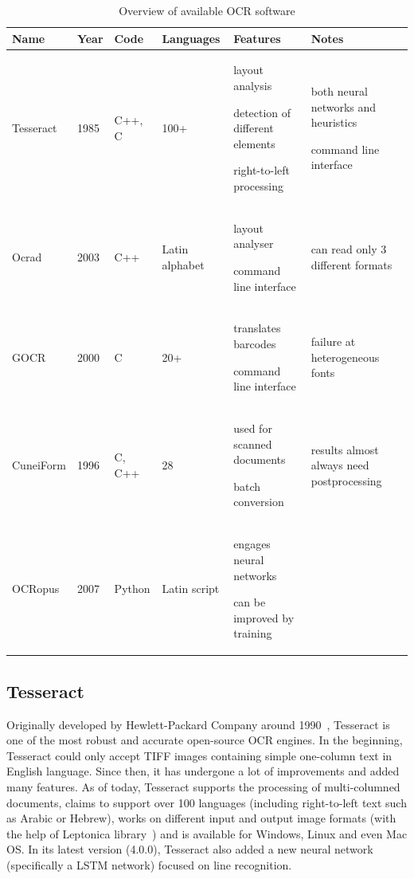 \begin{table}[t]
{\small
\begin{tabular}{p{4.6em}p{2em}p{3em}p{4.8em}p{7em}p{7em}}
\toprule
\textbf{Name} & \textbf{Year} & \textbf{Code} & \textbf{Languages} & \textbf{Features} & \textbf{Notes}\\
\midrule
Tesseract & 1985 & C++, C & 100+ & 
layout analysis

detection of different elements

right-to-left processing

&

both neural networks and heuristics

command line interface

\\
Ocrad & 2003 & C++ & Latin alphabet &  
layout analyser

command line interface
&
can read only 3 different formats
\\
GOCR & 2000 & C & 20+ &

translates barcodes

command line interface

&
failure at heterogeneous fonts

\\
CuneiForm & 1996 & C, C++ & 28 & 

used for scanned documents

batch conversion

& 
results almost always need postprocessing

\\
OCRopus & 2007 & Python & Latin script & 

engages neural networks

can be improved by training

\\

\bottomrule
\end{tabular}
}
\caption{Overview of available OCR software}
\label{tab:availableSoftware}
\end{table}

\subsection{Tesseract}

Originally developed by Hewlett-Packard Company around 1990~\citep{TesseractGIT}, Tesseract is one of the most robust and accurate open-source OCR engines. In the beginning, Tesseract could only accept TIFF images containing simple one-column text in English language. Since then, it has undergone a lot of improvements and added many features. As of today, Tesseract supports the processing of multi-columned documents, claims to support over 100 languages (including right-to-left text such as Arabic or Hebrew), works on different input and output image formats (with the help of Leptonica library~\citep{LeptonicaLIB}) and is available for Windows, Linux and even Mac OS. In its latest version (4.0.0), Tesseract also added a new neural network (specifically a LSTM network) focused on line recognition. 

